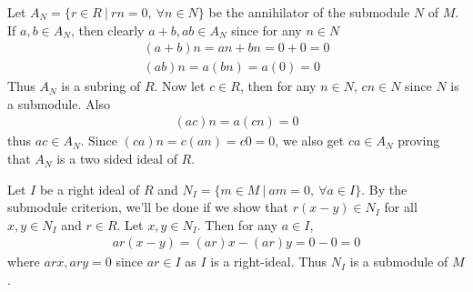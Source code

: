 \documentclass[12pt]{exam}
\theoremstyle{plain} %
\theoremstyle{definition} %
\theoremstyle{remark} %
\begin{document}
\begin{questions}
  \question
  \begin{solution}
    Let $A_N = \{ r \in R \ | \ rn = 0, \ \forall n \in N \}$ be the
    annihilator of the submodule $N$ of $M$. If $a, b \in A_N$, then
    clearly $a + b, ab \in A_N$ since for any $n \in N$
    \begin{align*}
      (a + b)n = an + bn = 0 + 0 = 0 \\
      (ab)n = a(bn) = a(0) = 0
    \end{align*}
    Thus $A_N$ is a subring of $R$. Now let $c \in R$, then for any
    $n \in N$, $cn \in N$ since $N$ is a submodule. Also
    \begin{align*}
      (ac)n = a(cn) = 0
    \end{align*}
    thus $ac \in A_N$. Since $(ca)n = c(an) = c0 = 0$, we also get
    $ca \in A_N$ proving that $A_N$ is a two sided ideal of $R$.
  \end{solution}

  \question
  \begin{solution}
    Let $I$ be a right ideal of $R$ and $N_I = \{ m \in M  \ | \  am
    = 0, \ \forall a \in I \}$. By the submodule criterion, we'll be
    done if we show that $r(x - y) \in N_I$ for all $x, y \in N_I$
    and $r \in R$. Let $x, y \in N_I$. Then for any $a \in I$,
    \begin{align*}
      ar(x - y) = (ar)x - (ar)y = 0 - 0 = 0
    \end{align*}
    where $arx, ary  = 0$ since $ar \in I$ as $ I$ is a right-ideal.
    Thus $N_I$ is a submodule of $M$.
  \end{solution}

  \question
  \begin{solution}
\end{solution}
\end{questions}
\end{document}
